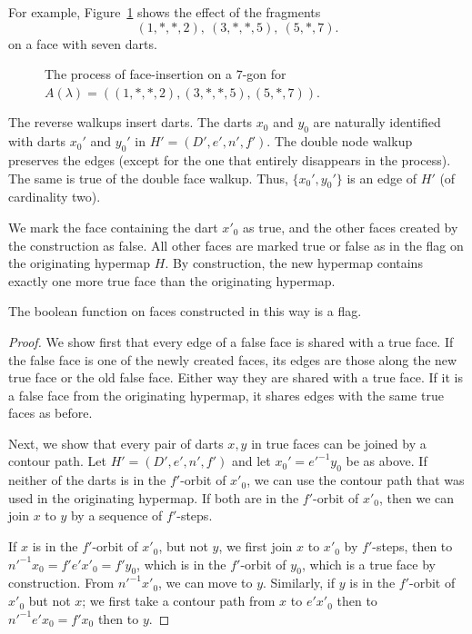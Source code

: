 For example, Figure~\ref{fig:7darts} shows the effect of the fragments
$$(1,*,*,2),\ (3,*,*,5),\ (5,*,7).
  $$ on a face with seven darts.


\begin{figure}[htb]
  \centering
  \caption{The process of face-insertion on a $7$-gon for
   $A(\lambda) = ((1,*,*,2),(3,*,*,5),(5,*,7))$.}
  \label{fig:7darts}
\end{figure}

The reverse walkups insert darts.  The darts $x_0$ and
$y_0$ are naturally identified with darts $x_0'$ and $y_0'$ in $H'=(D',e',n',f')$.
The double node walkup preserves the edges (except for
the one that entirely disappears in the process).  The same is true of the
double face walkup.  Thus, $\{x_0',y_0'\}$ is an edge of
$H'$ (of cardinality two).

We mark the face containing the dart $x'_0$ as true, and the other
faces created by the construction as false.   All other faces are
marked true or false as in the flag on the originating hypermap $H$.  By
construction, the new hypermap contains exactly one more true face
than the originating hypermap.

\begin{lemma}\label{lemma:flag} 
The boolean function on faces constructed in this way is a
flag.
\end{lemma}

\begin{proof}  We show first that every edge of a false face is shared
with a true face.  If the false face is one of the newly created
faces, its edges are those along the new true face or the old false
face. Either way they are shared with a true face.   If it is a
false face from the originating hypermap, it shares edges with the
same true faces as before.

Next, we show that every pair of darts $x,y$ in true faces can be
joined by a contour path.  Let $H'=(D',e',n',f')$ and let
$x_0' = e'^{-1} y_0$ be as above.  If neither of the darts is in the
$f'$-orbit of $x'_0$, we can use the contour path that was used in the
originating hypermap.  If both are in the $f'$-orbit of $x'_0$, then
we can join $x$ to $y$ by a sequence of $f'$-steps.

If $x$ is in the $f'$-orbit of $x'_0$, but not $y$, we first join $x$
to $x'_0$ by $f'$-steps, then to $n'^{-1} x_0 = f' e' x'_0 = f' y_0$, 
which is in
the $f'$-orbit of $y_0$, which is a true face by construction.
From $n'^{-1} x'_0$, we can move to $y$.
Similarly, if $y$ is in the $f'$-orbit of $x'_0$ but not $x$; we first
take a contour path from $x$ to $e' x'_0$ then to $n'^{-1} e' x_0 = f'
x_0$ then to $y$.
\end{proof}

